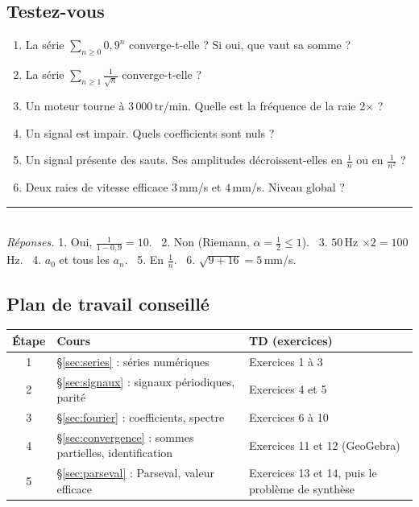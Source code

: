 \documentclass[a4paper,11pt]{article}
\begin{document}
\needspace{12cm}
\subsection{Testez-vous}\label{subsec:quiz}

\begin{exemple}
\begin{enumerate}
  \item La série $\sum_{n\geq0} 0{,}9^n$ converge-t-elle ? Si oui, que vaut sa somme ?
  \item La série $\sum_{n\geq1}\frac{1}{\sqrt n}$ converge-t-elle ?
  \item Un moteur tourne à $3\,000$\,tr/min. Quelle est la fréquence de la raie 2× ?
  \item Un signal est impair. Quels coefficients sont nuls ?
  \item Un signal présente des sauts. Ses amplitudes décroissent-elles en $\frac1n$ ou en $\frac1{n^2}$ ?
  \item Deux raies de vitesse efficace $3$\,mm/s et $4$\,mm/s. Niveau global ?
\end{enumerate}
\vspace{2pt}
\rule{\linewidth}{0.4pt}\\
\footnotesize\textit{Réponses.} 1. Oui, $\frac{1}{1-0{,}9} = 10$. \ 2. Non (Riemann, $\alpha = \frac12\leq 1$). \ 3. $50$\,Hz $\times 2 = 100$\,Hz. \ 4. $a_0$ et tous les $a_n$. \ 5. En $\frac1n$. \ 6. $\sqrt{9+16} = 5$\,mm/s.
\end{exemple}

\subsection{Plan de travail conseillé}\label{subsec:plan}

\begin{center}
\renewcommand{\arraystretch}{1.35}
\begin{tabular}{|c|p{6.5cm}|p{7.5cm}|}
\hline
\rowcolor{uimmlightblue}
\textbf{Étape} & \textbf{Cours} & \textbf{TD (exercices)} \\
\hline
1 & §\ref{sec:series} : séries numériques & Exercices 1 à 3 \\
\hline
2 & §\ref{sec:signaux} : signaux périodiques, parité & Exercices 4 et 5 \\
\hline
3 & §\ref{sec:fourier} : coefficients, spectre & Exercices 6 à 10 \\
\hline
4 & §\ref{sec:convergence} : sommes partielles, identification & Exercices 11 et 12 (GeoGebra) \\
\hline
5 & §\ref{sec:parseval} : Parseval, valeur efficace & Exercices 13 et 14, puis le problème de synthèse \\
\hline
\end{tabular}
\end{center}
\end{document}
